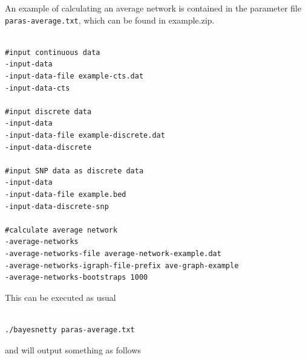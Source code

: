 \documentclass[a4paper,12pt]{article}
\newcommand{\code}[1]{{\footnotesize{{\tt #1}}}}
\begin{document}
An example of calculating an average network is contained in the parameter file \code{paras-average.txt}, which can be found in example.zip. 
\vspace{0.35cm} \begin{lstlisting}

#input continuous data
-input-data
-input-data-file example-cts.dat
-input-data-cts

#input discrete data
-input-data
-input-data-file example-discrete.dat
-input-data-discrete

#input SNP data as discrete data
-input-data
-input-data-file example.bed
-input-data-discrete-snp

#calculate average network
-average-networks
-average-networks-file average-network-example.dat
-average-networks-igraph-file-prefix ave-graph-example
-average-networks-bootstraps 1000

\end{lstlisting} \vspace{0.35cm}
This can be executed as usual 
\vspace{0.35cm} \begin{lstlisting}

./bayesnetty paras-average.txt

\end{lstlisting} \vspace{0.35cm}
and will output something as follows 
\end{document}
